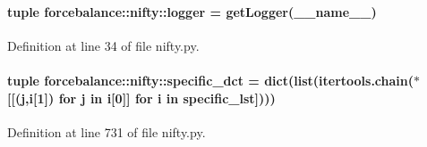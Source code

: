 \hypertarget{namespaceforcebalance_1_1nifty_a94fc8d9a0375d86ee16bfe16c896d74c}{
\paragraph[{logger}]{\setlength{\rightskip}{0pt plus 5cm}tuple {\bf forcebalance\-::nifty\-::logger} = get\-Logger(\-\_\-\-\_\-name\-\_\-\-\_\-)}}\label{namespaceforcebalance_1_1nifty_a94fc8d9a0375d86ee16bfe16c896d74c}


\-Definition at line 34 of file nifty.\-py.

\hypertarget{namespaceforcebalance_1_1nifty_a41091c8b7861352d9cba164b15d0d022}{
\paragraph[{specific\-\_\-dct}]{\setlength{\rightskip}{0pt plus 5cm}tuple {\bf forcebalance\-::nifty\-::specific\-\_\-dct} = dict(list(itertools.\-chain($\ast$\mbox{[}\mbox{[}(j,i\mbox{[}1\mbox{]}) for j in i\mbox{[}0\mbox{]}\mbox{]} for i in {\bf specific\-\_\-lst}\mbox{]})))}}\label{namespaceforcebalance_1_1nifty_a41091c8b7861352d9cba164b15d0d022}


\-Definition at line 731 of file nifty.\-py.

